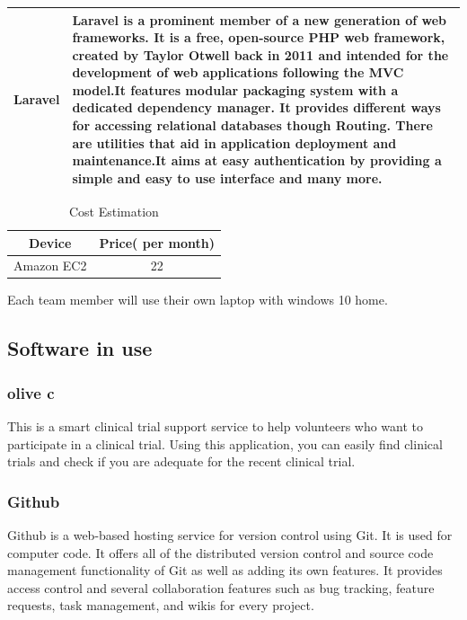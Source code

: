 \documentclass[letterpaper, 10 pt, conference]{ieeeconf}  %
\begin{document}
\begin{supertabular}{ |p{2cm}|p{5cm}|  }
\hline
Laravel & Laravel is a prominent member of a new generation of web frameworks. It is a free, open-source PHP web framework, created by Taylor Otwell back in 2011 and intended for the development of web applications following the MVC model.It features modular packaging system with a dedicated dependency manager.
It provides different ways for accessing relational databases though Routing.
There are utilities that aid in application deployment and maintenance.It aims at easy authentication by providing a simple and easy to use interface and many more.\\
\hline

\end{supertabular}



\begin{table}[h]
\caption{Cost Estimation}
\label{table_example}
\begin{center}
\begin{tabular}{|c||c|}
\hline
Device & Price( per month)\\
\hline
Amazon EC2 & 22\\
\hline
\end{tabular}
\end{center}
\end{table}


Each team member will use their own laptop with windows 10 home. 

\subsection{Software in use}
\subsubsection{olive c}
This is a smart clinical trial support service to help volunteers who want to participate in a clinical trial. Using this application, you can easily find clinical trials and check if you are adequate for the recent clinical trial.
\subsubsection{Github}
Github is a web-based hosting service for version control using Git. It is used for computer code. It offers all of the distributed version control and source code management functionality of Git as well as adding its own features. It provides access control and several collaboration features such as bug tracking, feature requests, task management, and wikis for every project.\\
\end{document}
